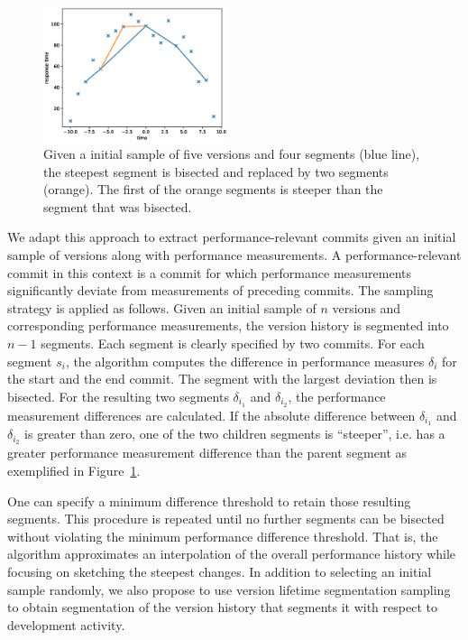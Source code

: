 \begin{figure}
 \begin{center}
   \vspace{-1cm}
   \includegraphics[width=0.48\textwidth]{images/inverse_douglas_peucker}
 \end{center}
 \caption{Given a initial sample of five versions and four segments (blue
 line), the steepest segment is bisected and replaced by two segments
 (orange).
The first of the orange segments is steeper than the segment that was
bisected. \label{fig:example_bisection}}
\end{figure}

We adapt this approach to extract performance-relevant commits given an initial
sample of versions along with performance measurements. A performance-relevant
commit in this context is a commit for which performance measurements
significantly deviate from measurements of preceding commits. The sampling
strategy is applied as follows. Given an initial sample of $n$ versions and
corresponding performance measurements, the version history is segmented into
$n-1$ segments. Each segment is clearly specified by two commits. For each
segment $s_i$, the algorithm computes the difference in performance
 measures $\delta_i$ for the start and the end commit. The segment with the
 largest deviation then is bisected. For the resulting two segments $\delta_{i_1}$ and $\delta_{i_2}$, the performance measurement differences are calculated. If the
absolute difference between $\delta_{i_1}$ and  $\delta_{i_2}$ is greater than
zero, one of the two children segments is ``steeper'', i.e. has a greater
performance measurement difference than the parent segment as exemplified in
Figure~\ref{fig:example_bisection}.

One can specify a minimum difference threshold to retain those resulting
segments. This procedure is repeated until no further segments can be bisected without violating the
minimum performance difference threshold. That is, the algorithm approximates
an interpolation of the overall performance history while focusing on sketching
the steepest changes. In addition to selecting an initial sample randomly, we
also propose to use version lifetime segmentation sampling to obtain
segmentation of the version history that segments it with respect to development
activity.

